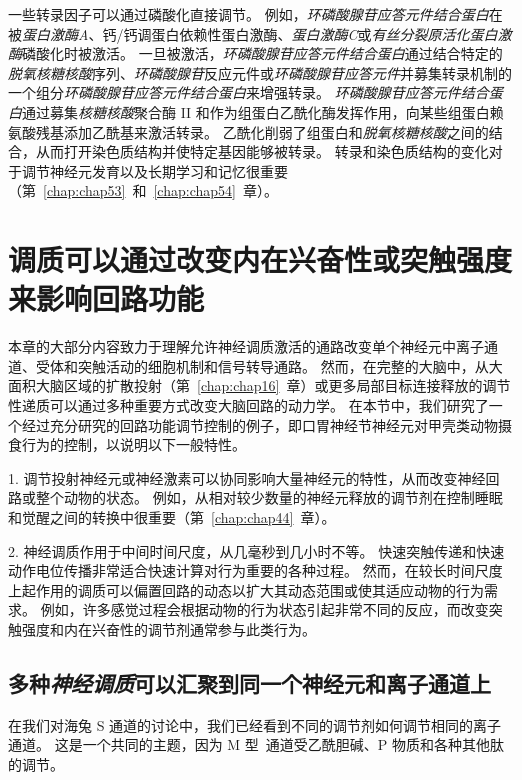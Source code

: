 一些转录因子可以通过磷酸化直接调节。
例如，\textit{环磷酸腺苷应答元件结合蛋白}在被\textit{蛋白激酶A}、钙/钙调蛋白依赖性蛋白激酶、\textit{蛋白激酶C}或\textit{有丝分裂原活化蛋白激酶}磷酸化时被激活。
一旦被激活，\textit{环磷酸腺苷应答元件结合蛋白}通过结合特定的\textit{脱氧核糖核酸}序列、\textit{环磷酸腺苷}反应元件或\textit{环磷酸腺苷应答元件}并募集转录机制的一个组分\textit{环磷酸腺苷应答元件结合蛋白}来增强转录。
\textit{环磷酸腺苷应答元件结合蛋白}通过募集\textit{核糖核酸}聚合酶 II 和作为组蛋白乙酰化酶发挥作用，向某些组蛋白赖氨酸残基添加乙酰基来激活转录。
乙酰化削弱了组蛋白和\textit{脱氧核糖核酸}之间的结合，从而打开染色质结构并使特定基因能够被转录。
转录和染色质结构的变化对于调节神经元发育以及长期学习和记忆很重要（第~\ref{chap:chap53}~和~\ref{chap:chap54}~章）。



\section{调质可以通过改变内在兴奋性或突触强度来影响回路功能}

本章的大部分内容致力于理解允许神经调质激活的通路改变单个神经元中离子通道、受体和突触活动的细胞机制和信号转导通路。
然而，在完整的大脑中，从大面积大脑区域的扩散投射（第~\ref{chap:chap16}~章）或更多局部目标连接释放的调节性递质可以通过多种重要方式改变大脑回路的动力学。
在本节中，我们研究了一个经过充分研究的回路功能调节控制的例子，即口胃神经节神经元对甲壳类动物摄食行为的控制，以说明以下一般特性。


1. 调节投射神经元或神经激素可以协同影响大量神经元的特性，从而改变神经回路或整个动物的状态。
例如，从相对较少数量的神经元释放的调节剂在控制睡眠和觉醒之间的转换中很重要（第~\ref{chap:chap44}~章）。


2. 神经调质作用于中间时间尺度，从几毫秒到几小时不等。
快速突触传递和快速动作电位传播非常适合快速计算对行为重要的各种过程。
然而，在较长时间尺度上起作用的调质可以偏置回路的动态以扩大其动态范围或使其适应动物的行为需求。
例如，许多感觉过程会根据动物的行为状态引起非常不同的反应，而改变突触强度和内在兴奋性的调节剂通常参与此类行为。



\subsection{多种\textit{神经调质}可以汇聚到同一个神经元和离子通道上}

在我们对海兔 S 通道的讨论中，我们已经看到不同的调节剂如何调节相同的离子通道。
这是一个共同的主题，因为 M 型~通道受乙酰胆碱、P 物质和各种其他肽的调节。


